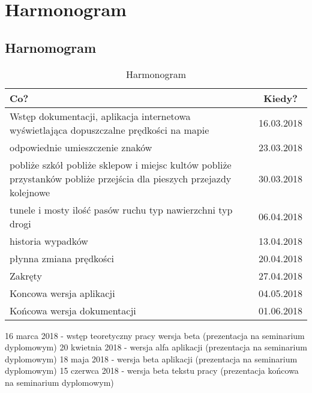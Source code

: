 \chapter{Harmonogram}
\label{cha:harmonogram}


\section{Harnomogram}
\label{sec:harmonogram}

\begin{table}[ht]
\centering
\caption{Harmonogram}
\label{Harmonogram}
\begin{tabular}{| p{12cm} | c |}
\hline
\textbf{Co?}                    & \textbf{Kiedy?} \\ \hline

Wstęp dokumentacji, aplikacja internetowa wyświetlająca dopuszczalne prędkości na mapie & 16.03.2018 \\ \hline

odpowiednie umieszczenie znaków & 23.03.2018 \\ \hline
pobliże szkół
pobliże sklepow i miejsc kultów
pobliże przystanków
pobliże przejścia dla pieszych 
przejazdy kolejnowe & 30.03.2018 \\ \hline

tunele i mosty
ilość pasów ruchu
typ nawierzchni
typ drogi & 06.04.2018 \\ \hline

historia wypadków & 13.04.2018 \\ \hline

płynna zmiana prędkości & 20.04.2018 \\ \hline

Zakręty & 27.04.2018 \\ \hline

Koncowa wersja aplikacji & 04.05.2018 \\ \hline

Końcowa wersja dokumentacji & 01.06.2018 \\ \hline
\end{tabular}
\end{table}


16 marca 2018 - wstęp teoretyczny pracy wersja beta (prezentacja na seminarium dyplomowym)
20 kwietnia 2018 - wersja alfa aplikacji (prezentacja na seminarium dyplomowym)
18 maja 2018 - wersja beta aplikacji (prezentacja na seminarium dyplomowym)
15 czerwca 2018 - wersja beta tekstu pracy (prezentacja końcowa na seminarium dyplomowym)
